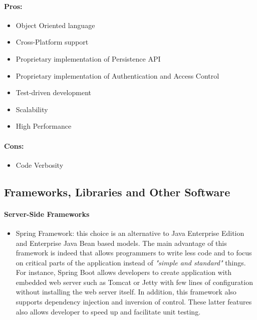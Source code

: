 \documentclass[a4paper]{article}
\begin{document}
\paragraph{Pros:}

\begin{itemize}
    \item Object Oriented language
    \item Cross-Platform support
    \item Proprietary implementation of Persistence API
    \item Proprietary implementation of Authentication and Access Control
    \item Test-driven development
    \item Scalability
    \item High Performance
\end{itemize}

\paragraph{Cons:}
\begin{itemize}
    \item Code Verbosity
\end{itemize}

\subsection{Frameworks, Libraries and Other Software}

\paragraph{Server-Side Frameworks}
\begin{itemize}
    \item Spring Framework: this choice is an alternative to Java Enterprise Edition and Enterprise Java Bean based models. The main advantage of this framework is indeed that allows programmers to write less code and to focus on critical parts of the application instead of \textit{"simple and standard"} things. For instance, Spring Boot allows developers to create application with embedded web server such as Tomcat or Jetty with few lines of configuration without installing the web server itself. In addition, this framework also supports dependency injection and inversion of control. These latter features also allows developer to speed up and facilitate unit testing.
\end{itemize}
\end{document}
